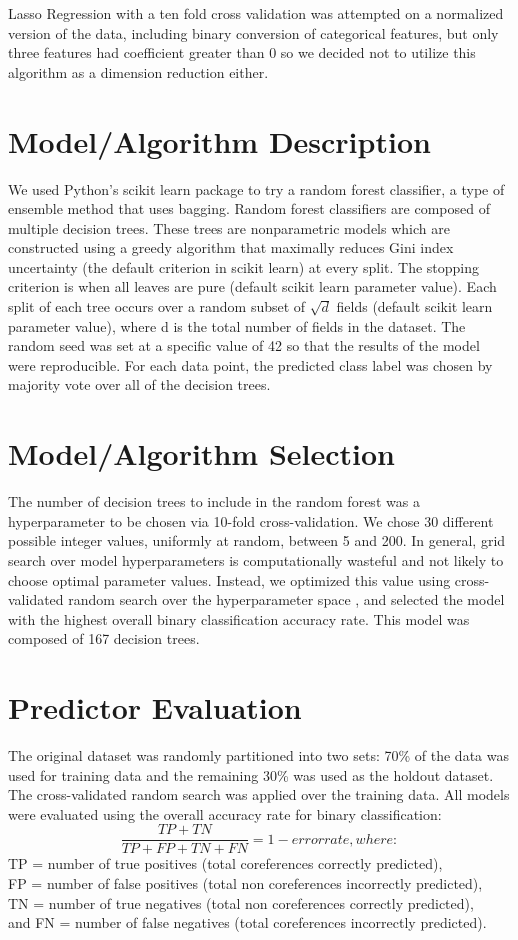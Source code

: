 \documentclass[twoside,11pt]{article}
\begin{document}
Lasso Regression with a ten fold cross validation was attempted on a normalized version of the data, including binary conversion of categorical features, but only three features had coefficient greater than 0 so we decided not to utilize this algorithm as a dimension reduction either.

\section{Model/Algorithm Description}
We used Python's scikit learn package to try a random forest classifier, a type of ensemble method that uses bagging. Random forest classifiers are composed of multiple decision trees. These trees are nonparametric models which are constructed using a greedy algorithm that maximally reduces Gini index uncertainty (the default criterion in scikit learn) at every split. The stopping criterion is when all leaves are pure (default scikit learn parameter value). Each split of each tree occurs over a random subset of $\sqrt{d}$ fields (default scikit learn parameter value), where d is the total number of fields in the dataset. The random seed was set at a specific value of 42 so that the results of the model were reproducible. For each data point, the predicted class label was chosen by majority vote over all of the decision trees.

\section{Model/Algorithm Selection}
The number of decision trees to include in the random forest was a hyperparameter to be chosen via 10-fold cross-validation. We chose 30 different possible integer values, uniformly at random, between 5 and 200. In general, grid search over model hyperparameters is computationally wasteful and not likely to choose optimal parameter values. Instead, we optimized this value using cross-validated random search over the hyperparameter space \citep{james12}, and selected the model with the highest overall binary classification accuracy rate. This model was composed of 167 decision trees.

\section{Predictor Evaluation}
The original dataset was randomly partitioned into two sets: 70\% of the data was used for training data and the remaining 30\% was used as the holdout dataset. The cross-validated random search was applied over the training data. 
All models were evaluated using the overall accuracy rate for binary classification: \[\frac{TP + TN}{TP+FP+TN+FN} = 1 - error rate, where:\] 
TP = number of true positives (total coreferences correctly predicted), \\
FP = number of false positives (total non coreferences incorrectly predicted), \\
TN = number of true negatives (total non coreferences correctly predicted), \\
 and FN = number of false negatives (total coreferences incorrectly predicted).\\
 
\end{document}
